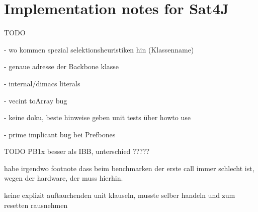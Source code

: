 \section{Implementation notes for Sat4J}
TODO

- wo kommen spezial selektionsheuristiken hin (Klassenname)

- genaue adresse der Backbone klasse

- internal/dimacs literals

- vecint toArray bug

- keine doku, beste hinweise geben unit tests über howto use

- prime implicant bug bei Prefbones

TODO PB1x besser als IBB, unterschied ?????

habe irgendwo footnote dass beim benchmarken der erste call immer schlecht ist, wegen der hardware, der muss hierhin.

keine explizit auftauchenden unit klauseln, musste selber handeln und zum resetten rausnehmen